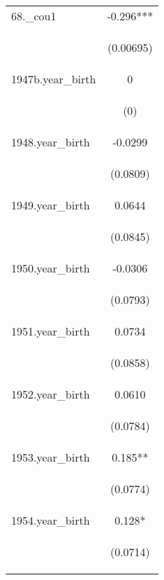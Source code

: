 \documentclass[]{article}
\begin{document}
\begin{center}
\begin{tabular}{lc}
68.\_cou1 & -0.296*** \\
\vspace{4pt} & \begin{footnotesize}(0.00695)\end{footnotesize} \\
1947b.year\_birth & 0 \\
\vspace{4pt} & \begin{footnotesize}(0)\end{footnotesize} \\
1948.year\_birth & -0.0299 \\
\vspace{4pt} & \begin{footnotesize}(0.0809)\end{footnotesize} \\
1949.year\_birth & 0.0644 \\
\vspace{4pt} & \begin{footnotesize}(0.0845)\end{footnotesize} \\
1950.year\_birth & -0.0306 \\
\vspace{4pt} & \begin{footnotesize}(0.0793)\end{footnotesize} \\
1951.year\_birth & 0.0734 \\
\vspace{4pt} & \begin{footnotesize}(0.0858)\end{footnotesize} \\
1952.year\_birth & 0.0610 \\
\vspace{4pt} & \begin{footnotesize}(0.0784)\end{footnotesize} \\
1953.year\_birth & 0.185** \\
\vspace{4pt} & \begin{footnotesize}(0.0774)\end{footnotesize} \\
1954.year\_birth & 0.128* \\
\vspace{4pt} & \begin{footnotesize}(0.0714)\end{footnotesize} \\

\end{tabular}
\end{center}
\end{document}
